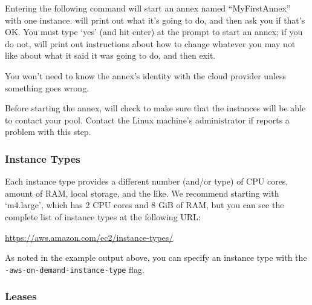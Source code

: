 Entering the following command will start an annex named ``MyFirstAnnex'' with
one instance.   will print out what it's going to do, and then
ask you if that's OK.  You must type `yes' (and hit enter) at the prompt to
start an annex; if you do not,  will print out instructions
about how to change whatever you may not like about what it said it was going
to do, and then exit.


You won't need to know the annex's identity with the cloud provider unless
something goes wrong.

Before starting the annex,  will check to make sure that the
instances will be able to contact your pool.  Contact the Linux machine's
administrator if  reports a problem with this step.

\subsubsection{Instance Types}

Each instance type provides a different number (and/or type) of CPU cores,
amount of RAM, local storage, and the like.  We recommend starting with
`m4.large', which has 2 CPU cores and 8 GiB of RAM, but you can see the
complete list of instance types at the following URL:

\url{https://aws.amazon.com/ec2/instance-types/}

As noted in the example output above, you can specify an instance type with
the \texttt{-aws-on-demand-instance-type} flag.

\subsubsection{Leases}


